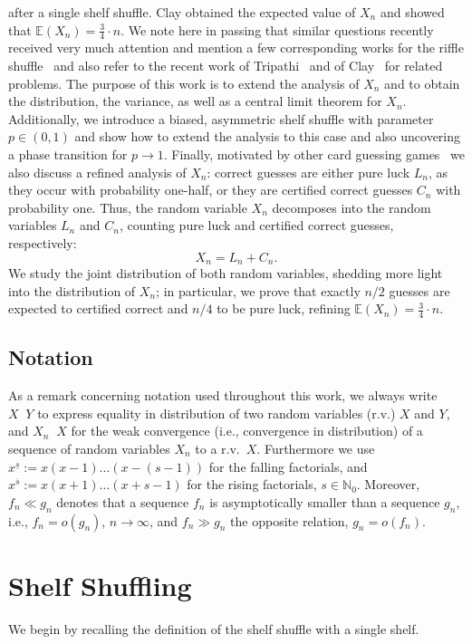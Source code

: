 \documentclass[10pt,reqno,a4paper]{amsart}
\theoremstyle{definition}
\def\E{{\mathbb {E}}}
\newcommand{\fallfak}[2]{\ensuremath{#1^{\underline{#2}}}}
\newcommand{\auffak}[2]{\ensuremath{#1^{\overline{#2}}}}
\newcommand{\N}{\ensuremath{\mathbb{N}}}
\DeclareMathOperator{\law}{\overset{\mathcal{L}}{=}}
\DeclareMathOperator{\claw}{\overset{\mathcal{L}}{\rightarrow}}
\begin{document}
after a single shelf shuffle. Clay obtained the expected value of $X_n$ and showed that $\E(X_n)=\frac34\cdot n$. 
We note here in passing that similar questions recently received very much attention and mention a few corresponding works for the riffle shuffle~\cite{Ciucu1998,KSTY2023,NFNW-KT2022,KT2023,Liu2021}
and also refer to the recent work of Tripathi~\cite{Tripathi2026} and of Clay~\cite{Clay2025b} for related problems. The purpose of this work is to extend the analysis of $X_n$ and to obtain the distribution, the variance, as well as a central limit theorem for $X_n$. Additionally, we introduce a biased, asymmetric shelf shuffle
with parameter $p\in(0,1)$ and show how to extend the analysis to this case and also uncovering a phase transition for $p\to 1$. Finally, motivated by other card guessing games~\cite{KP2024} we also discuss a refined analysis of $X_n$: correct guesses are either pure luck $L_n$, as they occur with probability one-half, or they are certified correct guesses $C_n$ with probability one. Thus, the random variable $X_n$ decomposes into the random variables $L_n$ and $C_n$, counting pure luck and certified correct guesses, respectively:
\[
X_n=L_n+C_n.
\]
We study the joint distribution of both random variables, shedding more light into the distribution of $X_n$; in particular, we prove
that exactly $n/2$ guesses are expected to certified correct and $n/4$ to be pure luck, refining $\E(X_n)=\frac34\cdot n$. 


\subsection{Notation}
As a remark concerning notation used throughout this work, we always write $X \law Y$ to express equality in distribution of two random variables (r.v.) $X$ and $Y$, and $X_{n} \claw X$ for the weak convergence (i.e., convergence in distribution) of a sequence
of random variables $X_{n}$ to a r.v.\ $X$. Furthermore we use $\fallfak{x}{s}:=x(x-1)\dots(x-(s-1))$ for the falling factorials, and $\auffak{x}{s}:=x(x+1)\dots(x+s-1)$ for the rising factorials, $s\in\N_0$. Moreover, $f_{n} \ll g_{n}$ denotes that a sequence $f_{n}$ is asymptotically smaller than a sequence $g_{n}$, i.e., $f_{n} = o(g_{n})$, $n \to \infty$, and $f_{n} \gg g_{n}$ the opposite relation, 
$g_{n} = o(f_{n})$.


\section{Shelf Shuffling}
We begin by recalling the definition of the shelf shuffle with a single shelf. 
\end{document}
